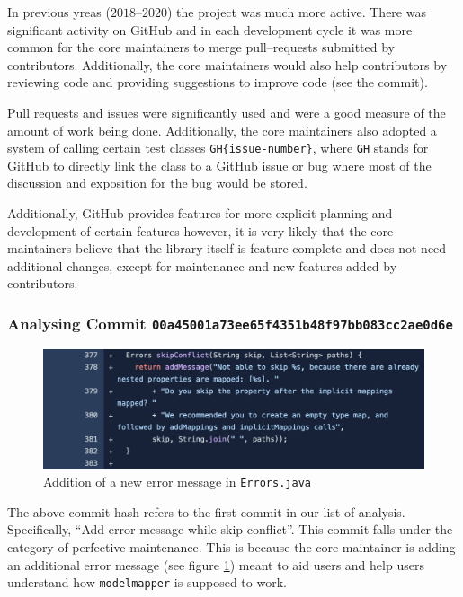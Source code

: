 \documentclass[12pt]{article}
\newcommand{\modelmapper}{\texttt{modelmapper}\xspace}
\begin{document}
In previous yreas ($2018$--$2020$) the project was much more
active. There was significant activity on GitHub and in each
development cycle it was more common for the core maintainers to
merge pull--requests submitted by contributors. Additionally,
the core maintainers would also help contributors by reviewing
code and providing suggestions to improve code (see the 
commit).

Pull requests and issues were significantly used and were a
good measure of the amount of work being done. Additionally, the
core maintainers also adopted a system of calling certain test
classes \verb|GH{issue-number}|, where \texttt{GH} stands for
GitHub to directly link the class to a GitHub issue or bug
where most of the discussion and exposition for the bug would be
stored.

Additionally, GitHub provides features for more explicit planning
and development of certain features however, it is very likely
that the core maintainers believe that the library itself is
feature complete and does not need additional changes, except
for maintenance and new features added by contributors.

\subsubsection{Analysing Commit
\texttt{00a45001a73ee65f4351b48f97bb083cc2ae0d6e}}

\begin{figure}[H]
    \centering
    \includegraphics[width=14cm]{images/code-diff.png}
    \caption{Addition of a new error message in
    \texttt{Errors.java}}
    \label{error-message}
\end{figure}

The above commit hash refers to the first commit in our list of
analysis. Specifically, ``Add error message while skip
conflict''. This commit falls under the category of perfective
maintenance. This is because the core maintainer is adding an
additional error message (see figure \ref{error-message}) meant
to aid users and help users understand how \modelmapper is
supposed to work.
\end{document}
